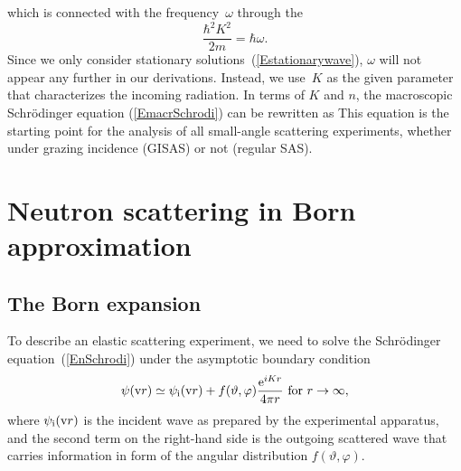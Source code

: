 which is connected with the frequency~$\omega$ through the
\begin{equation}
  \frac{\hbar^2 K^2}{2m} = \hbar\omega.
\end{equation}
Since we only consider stationary solutions~(\ref{Estationarywave}),
$\omega$ will not appear any further in our derivations.
Instead, we use~$K$ as the given parameter that characterizes the
incoming radiation.
In terms of $K$ and $n$,
the macroscopic Schrödinger equation (\ref{EmacrSchrodi})
can be rewritten as
This equation is the starting point for the analysis of all
small-angle scattering experiments,
whether under grazing incidence (GISAS) or not (regular SAS).
%
%

%
%

\section{Neutron scattering in Born approximation}\label{SBornApprox}

\subsection{The Born expansion}\label{SBornExpans}

%

To describe an elastic scattering experiment,
we need to solve the Schrödinger equation~(\ref{EnSchrodi})
under the asymptotic boundary condition
\begin{equation}\label{Escabouco}
  \psi(\text{v}{r})
  \simeq \psi_{\text{i}}(\text{v}{r}) + f(\vartheta,\varphi)\frac{\text{e}^{iKr}}{4\pi r}
  \text{~for~}r\to\infty,
\end{equation}
%
%
where $\psi_{\text{i}}(\text{v}{r})$ is the incident wave
as prepared by the experimental apparatus,
and the second term on the right-hand side is
the outgoing scattered wave
that carries information in form of the angular distribution
$f(\vartheta,\varphi)$.

